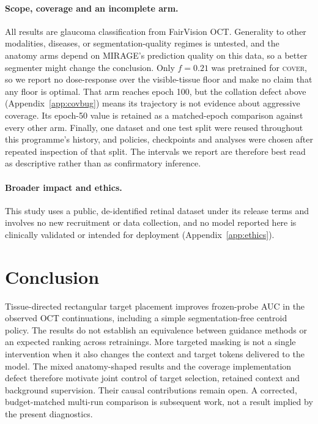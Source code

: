 \documentclass{article}
\begin{document}
\paragraph{Scope, coverage and an incomplete arm.}
All results are glaucoma classification from FairVision OCT. Generality to other
modalities, diseases, or segmentation-quality regimes is untested, and the
anatomy arms depend on MIRAGE's prediction quality on this data, so a better
segmenter might change the conclusion. Only $f{=}0.21$ was pretrained for
\textsc{cover}, so we report no dose-response over the visible-tissue floor and
make no claim that any floor is optimal. That arm reaches epoch 100, but the
collation defect above (Appendix~\ref{app:covbug}) means its trajectory is not
evidence about aggressive coverage. Its epoch-50 value is retained as a
matched-epoch comparison against every other arm. Finally, one dataset and one test split were
reused throughout this programme's history, and policies, checkpoints and
analyses were chosen after repeated inspection of that split. The intervals we
report are therefore best read as descriptive rather than as confirmatory
inference.

\paragraph{Broader impact and ethics.}
This study uses a public, de-identified retinal dataset under its release terms
and involves no new recruitment or data collection, and no model reported here
is clinically validated or intended for deployment (Appendix~\ref{app:ethics}).

\section{Conclusion}

Tissue-directed rectangular target placement improves frozen-probe AUC in the
observed OCT continuations, including a simple segmentation-free centroid policy.
The results do not establish an equivalence between guidance methods or an
expected ranking across retrainings. More targeted masking is not a single
intervention when it also changes the context and target tokens delivered to
the model. The mixed anatomy-shaped results and the coverage implementation
defect therefore motivate joint control of target selection, retained context
and background supervision. Their causal contributions remain open. A
corrected, budget-matched multi-run comparison is subsequent work, not a result
implied by the present diagnostics.
\end{document}
